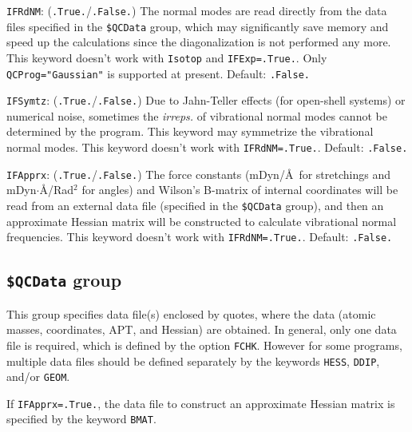 \documentclass[12pt,english]{extarticle}
\begin{document}
\bigskip{}\bigskip{}
\verb|IFRdNM|: (\verb|.True.|/\verb|.False.|) The normal modes are read directly from the data files specified in the \texttt{\$QCData} group, which may significantly save memory and speed up the calculations since the diagonalization is not performed any more. This keyword
doesn't work with \verb|Isotop| and \verb|IFExp=.True.|. Only \verb|QCProg="Gaussian"| is supported at present. Default: \verb|.False.|

\bigskip{}\bigskip{}
\verb|IFSymtz|: (\verb|.True.|/\verb|.False.|) Due to Jahn-Teller effects (for open-shell systems) or numerical noise, sometimes the \textit{irreps.} of vibrational normal modes cannot be determined by the program. This keyword may symmetrize the vibrational normal modes.
This keyword doesn't work with \verb|IFRdNM=.True.|. Default: \verb|.False.|

\bigskip{}
\verb|IFApprx|: (\verb|.True.|/\verb|.False.|) The force constants (mDyn/\AA ~for stretchings and mDyn$\cdot$\AA/Rad$^2$ for angles) and Wilson's B-matrix of internal coordinates will be read from an external data file (specified in the \texttt{\$QCData} group), and then an approximate Hessian matrix will be constructed to calculate vibrational normal frequencies.  This keyword
doesn't work with \verb|IFRdNM=.True.|. Default: \verb|.False.|

\subsection{\texttt{\$QCData} group} \label{sec:inp-qcdata}

This group specifies data file(s) enclosed by quotes, where the data (atomic
masses, coordinates, APT, and Hessian) are obtained. In general,
only one data file is required, which is defined by the option
\verb|FCHK|. However for some programs, multiple data files should be
defined separately by the keywords \verb|HESS|, \verb|DDIP|, and/or
\verb|GEOM|.

If \verb|IFApprx=.True.|, the data file to construct an approximate Hessian matrix is specified by the keyword \verb|BMAT|.
\end{document}
